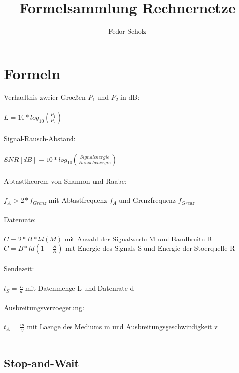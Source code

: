 \documentclass[a4paper]{scrreprt}
\begin{document}
\title{Formelsammlung Rechnernetze}
\author{Fedor Scholz}
\maketitle

\tableofcontents
\vspace{1cm}

\chapter{Formeln}

Verhaeltnis zweier Groeßen $P_1$ und $P_2$ in dB:\\\\
$L = 10*log_{10}(\frac{P_1}{P_2})$\\\\

Signal-Rausch-Abstand:\\\\
$SNR[dB] = 10*log_{10}(\frac{Signalenergie}{Rauschenergie})$\\\\

Abtasttheorem von Shannon und Raabe:\\\\
$f_A > 2 * f_{Grenz}$ mit Abtastfrequenz $f_A$ und Grenzfrequenz $f_{Grenz}$\\\\

Datenrate:\\\\
$C = 2*B*ld(M)$ mit Anzahl der Signalwerte M und Bandbreite B\\
$C = B*ld(1 + \frac{S}{R})$ mit Energie des Signals S und Energie der Stoerquelle R\\\\

Sendezeit:\\\\
$t_S = \frac{L}{d}$ mit Datenmenge L und Datenrate d\\\\

Ausbreitungsverzoegerung:\\\\
$t_A = \frac{m}{v}$ mit Laenge des Mediums m und Ausbreitungsgeschwindigkeit v\\\\


\section{Stop-and-Wait}
\end{document}
